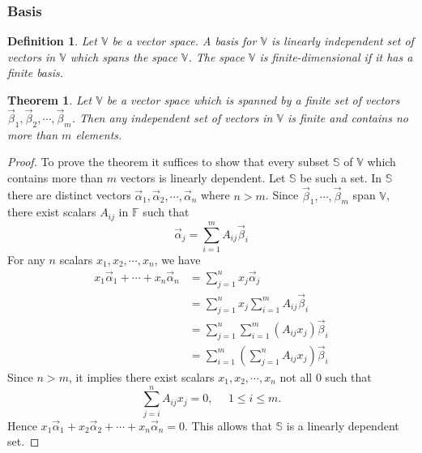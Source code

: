 \documentclass{article}
\newtheorem*{definition}{Definition}
\newtheorem{theorem}{Theorem}
\begin{document}
    \subsubsection{Basis}
    \begin{definition}
        Let \(\mathbb{V}\) be a vector space. A basis for \(\mathbb{V}\) is linearly
        independent set of vectors in \(\mathbb{V}\) which spans the space \(\mathbb{V}\).
        The space \(\mathbb{V}\) is finite-dimensional if it has a finite basis.
    \end{definition}
    \begin{theorem}
        Let \(\mathbb{V}\) be a vector space which is spanned by a finite set of vectors 
        \(\vec{\beta}_1, \vec{\beta}_2, \cdots, \vec{\beta}_m\). Then any independent set 
        of vectors in \(\mathbb{V}\) is finite and contains no more than \(m\) elements.
    \end{theorem}
    \begin{proof}
        To prove the theorem it suffices to show that every subset \(\mathbb{S}\) of
        \(\mathbb{V}\) which contains more than \(m\) vectors is linearly dependent.
        Let \(\mathbb{S}\) be such a set. In \(\mathbb{S}\) there are distinct vectors 
        \(\vec{\alpha}_1, \vec{\alpha}_2, \cdots, \vec{\alpha}_n\) where \(n > m\). 
        Since \(\vec{\beta}_1, \cdots, \vec{\beta}_m\) span \(\mathbb{V}\), there exist
        scalars \(A_{ij}\) in \(\mathbb{F}\) such that 
        \begin{equation*}
            \vec{\alpha}_j = \sum_{i=1}^{m} A_{ij} \vec{\beta}_i
        \end{equation*}
        For any \(n\) scalars \(x_1, x_2, \cdots, x_n\), we have 
        \begin{equation*}
            \begin{split}
                x_1 \vec{\alpha}_1 + \cdots + x_n \vec{\alpha}_n &= \sum_{j=1}^{n} x_{j} \vec{\alpha}_j \\
                                                                 &= \sum_{j=1}^{n} x_{j} \sum_{i=1}^{m} A_{ij} \vec{\beta}_i \\
                                                                 &= \sum_{j=1}^{n} \sum_{i=1}^{m} (A_{ij} x_j) \vec{\beta}_{i} \\
                                                                 &= \sum_{i=1}^{m} (\sum_{j=1}^{n} A_{ij}x_{j}) \vec{\beta}_{i}
            \end{split}
        \end{equation*}
        Since \(n > m\), it implies there exist scalars \(x_1, x_2, \cdots, x_n\) not all \(0\) such that 
        \begin{equation*}
            \sum_{j=i}^{n} A_{ij}x_j=0, \ \ \ \ \ \ 1 \leq i \leq m.
        \end{equation*}
        Hence \(x_1 \vec{\alpha}_1 + x_2 \vec{\alpha}_2 + \cdots + x_n \vec{\alpha}_n = 0\). 
        This allows that \(\mathbb{S}\) is a linearly dependent set.
    \end{proof}
\end{document}
